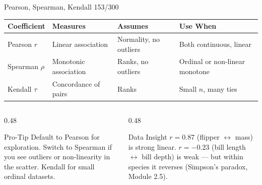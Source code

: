 \documentclass[10pt]{beamer}
\newcommand{\smark}[1]{\hfill{\scriptsize\color{codegray}#1}}
\begin{document}
\begin{frame}{Pearson, Spearman, Kendall}
\smark{153/300}
\centering\small
\begin{tabular}{@{}llll@{}}
    \toprule
    \textbf{Coefficient} & \textbf{Measures} & \textbf{Assumes} & \textbf{Use When} \\
    \midrule
    Pearson $r$   & Linear association       & Normality, no outliers & Both continuous, linear \\
    Spearman $\rho$ & Monotonic association  & Ranks, no outliers     & Ordinal or non-linear monotone \\
    Kendall $\tau$  & Concordance of pairs   & Ranks                  & Small $n$, many ties \\
    \bottomrule
\end{tabular}

\vspace{0.3cm}
\begin{columns}[T]
\begin{column}{0.48\textwidth}
\begin{alertblock}{Pro-Tip}
    \scriptsize Default to Pearson for exploration. Switch to Spearman if you see outliers or non-linearity in the scatter. Kendall for small ordinal datasets.
\end{alertblock}
\end{column}
\begin{column}{0.48\textwidth}
\begin{exampleblock}{Data Insight}
    \scriptsize $r = 0.87$ (flipper $\leftrightarrow$ mass) is strong linear. $r = -0.23$ (bill length $\leftrightarrow$ bill depth) is weak --- but within species it reverses (Simpson's paradox, Module 2.5).
\end{exampleblock}
\end{column}
\end{columns}
\end{frame}
\end{document}
